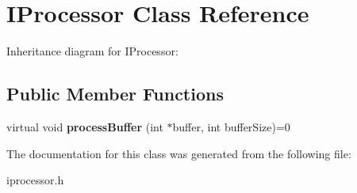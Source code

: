 \hypertarget{classIProcessor}{}\section{I\+Processor Class Reference}
\label{classIProcessor}


Inheritance diagram for I\+Processor\+:
\subsection*{Public Member Functions}
\begin{DoxyCompactItemize}
\item 
\mbox{\label{classIProcessor_a85f4ee295be87727d8fab8b5c4ea71b1}} 
virtual void {\bfseries process\+Buffer} (int $\ast$buffer, int buffer\+Size)=0
\end{DoxyCompactItemize}


The documentation for this class was generated from the following file\+:\begin{DoxyCompactItemize}
\item 
iprocessor.\+h\end{DoxyCompactItemize}
